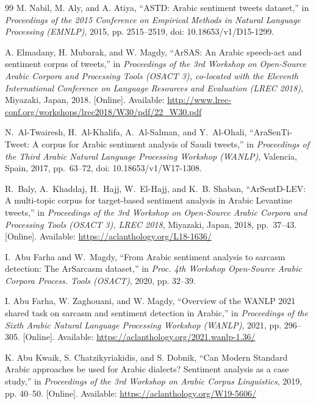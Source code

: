 \begin{thebibliography}{99}
M. Nabil, M. Aly, and A. Atiya, ``{ASTD}: {A}rabic sentiment tweets dataset,'' in \emph{Proceedings of the 2015 Conference on Empirical Methods in Natural Language Processing (EMNLP)}, 2015, pp. 2515--2519, doi: 10.18653/v1/D15-1299.

A. Elmadany, H. Mubarak, and W. Magdy, ``{ArSAS}: An {A}rabic speech-act and sentiment corpus of tweets,'' in \emph{Proceedings of the 3rd Workshop on Open-Source Arabic Corpora and Processing Tools (OSACT 3), co-located with the Eleventh International Conference on Language Resources and Evaluation (LREC 2018)}, Miyazaki, Japan, 2018. [Online]. Available: \url{http://www.lrec-conf.org/workshops/lrec2018/W30/pdf/22_W30.pdf}

N.~Al-Twairesh, H.~Al-Khalifa, A.~Al-Salman, and Y.~Al-Ohali, ``AraSenTi-Tweet: A corpus for Arabic sentiment analysis of Saudi tweets,'' in \emph{Proceedings of the Third Arabic Natural Language Processing Workshop (WANLP)}, Valencia, Spain, 2017, pp.~63--72, doi: 10.18653/v1/W17-1308.

R.~Baly, A.~Khaddaj, H.~Hajj, W.~El-Hajj, and K.~B. Shaban, ``ArSentD-LEV: A multi-topic corpus for target-based sentiment analysis in Arabic Levantine tweets,'' in \emph{Proceedings of the 3rd Workshop on Open-Source Arabic Corpora and Processing Tools (OSACT 3), LREC 2018}, Miyazaki, Japan, 2018, pp.~37--43. [Online]. Available: \url{https://aclanthology.org/L18-1636/}

I.~Abu Farha and W.~Magdy, ``From Arabic sentiment analysis to sarcasm detection: The ArSarcasm dataset,'' in \emph{Proc. 4th Workshop Open-Source Arabic Corpora Process. Tools (OSACT)}, 2020, pp. 32--39.

I. Abu Farha, W. Zaghouani, and W. Magdy, ``Overview of the {WANLP} 2021 shared task on sarcasm and sentiment detection in {A}rabic,'' in \emph{Proceedings of the Sixth Arabic Natural Language Processing Workshop (WANLP)}, 2021, pp. 296--305. [Online]. Available: \url{https://aclanthology.org/2021.wanlp-1.36/}

K. Abu Kwaik, S. Chatzikyriakidis, and S. Dobnik, ``Can {M}odern {S}tandard {A}rabic approaches be used for {A}rabic dialects? {S}entiment analysis as a case study,'' in \emph{Proceedings of the 3rd Workshop on Arabic Corpus Linguistics}, 2019, pp. 40--50. [Online]. Available: \url{https://aclanthology.org/W19-5606/}


\end{thebibliography}
